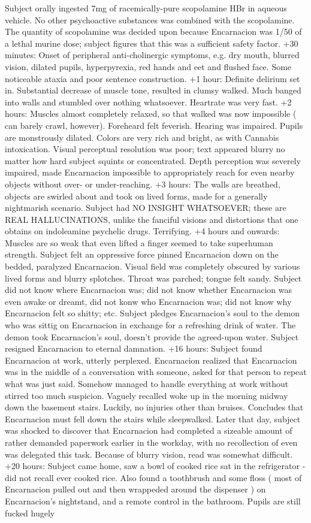 \documentclass[12pt]{book}
\begin{document}
Subject orally ingested 7mg of racemically-pure scopolamine HBr in aqueous vehicle. No other psychoactive substances was combined with the scopolamine. The quantity of scopolamine was decided upon because Encarnacion was 1/50 of a lethal murine dose; subject figures that this was a sufficient safety factor. +30 minutes: Onset of peripheral anti-cholinergic symptoms, e.g. dry mouth, blurred vision, dilated pupils, hyperpyrexia, red hands and eet and flushed face. Some noticeable ataxia and poor sentence construction. +1 hour: Definite delirium set in. Substantial decrease of muscle tone, resulted in clumsy walked. Much banged into walls and stumbled over nothing whatsoever. Heartrate was very fast. +2 hours: Muscles almost completely relaxed, so that walked was now impossible ( can barely crawl, however). Foreheard felt feverish. Hearing was impaired. Pupils are monstrously dilated. Colors are very rich and bright, as with Cannabis intoxication. Visual perceptual resolution was poor; text appeared blurry no matter how hard subject squints or concentrated. Depth perception was severely impaired, made Encarnacion impossible to appropriately reach for even nearby objects without over- or under-reaching. +3 hours: The walls are breathed, objects are swirled about and took on lived forms, made for a generally nightmarish scenario. Subject had NO INSIGHT WHATSOEVER; these are REAL HALLUCINATIONS, unlike the fanciful visions and distortions that one obtains on indoleamine psychelic drugs. Terrifying. +4 hours and onwards: Muscles are so weak that even lifted a finger seemed to take superhuman strength. Subject felt an oppressive force pinned Encarnacion down on the bedded, paralyzed Encarnacion. Visual field was completely obscured by various lived forms and blurry splotches. Throat was parched; tongue felt sandy. Subject did not know where Encarnacion was; did not know whether Encarnacion was even awake or dreamt, did not konw who Encarnacion was; did not know why Encarnacion felt so shitty; etc. Subject pledges Encarnacion's soul to the demon who was sittig on Encarnacion in exchange for a refreshing drink of water. The demon took Encarnacion's soul, doesn't provide the agreed-upon water. Subject resigned Encarnacion to eternal damnation. +16 hours: Subject found Encarnacion at work, utterly perplexed. Encarnacion realized that Encarnacion was in the middle of a conversation with someone, asked for that person to repeat what was just said. Somehow managed to handle everything at work without stirred too much suspicion. Vaguely recalled woke up in the morning midway down the basement stairs. Luckily, no injuries other than bruises. Concludes that Encarnacion must fell down the stairs while sleepwalked. Later that day, subject was shocked to discover that Encarnacion had completed a sizeable amount of rather demanded paperwork earlier in the workday, with no recollection of even was delegated this task. Because of blurry vision, read was somewhat difficult. +20 hours: Subject came home, saw a bowl of cooked rice sat in the refrigerator - did not recall ever cooked rice. Also found a toothbrush and some floss ( most of Encarnacion pulled out and then wrappeded around the dispenser ) on Encarnacion's nightstand, and a remote control in the bathroom. Pupils are still fucked hugely 
\end{document}
